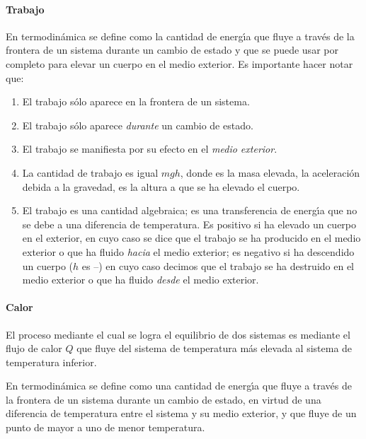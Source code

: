 \paragraph{Trabajo} En termodin\'amica  se define como la cantidad de energ\'{\i}a que fluye a trav\'es de la frontera de un sistema durante un cambio de estado y que se puede usar por completo para elevar un cuerpo en el medio exterior. Es importante hacer notar que:
\begin{enumerate}
\item El trabajo s\'olo aparece en la frontera de un sistema.
\item El trabajo s\'olo aparece \textit{durante} un cambio de estado.
\item El trabajo se manifiesta por su efecto en el \textit{ medio exterior}.
\item La cantidad de trabajo es igual $mgh$, donde  es la masa elevada,
 la aceleraci\'on debida a la gravedad,  es la
altura a que se ha elevado el cuerpo.
\item El trabajo es una cantidad algebraica; es una transferencia de energ\'{\i}a que no se debe a una diferencia de temperatura. Es positivo si ha elevado un cuerpo en el exterior, en cuyo caso se dice que el trabajo se ha producido en
el medio exterior o que ha fluido \textit{hacia} el medio exterior; es
negativo si ha descendido un cuerpo ($h$ es --) en cuyo caso decimos que el
trabajo se ha destruido en el medio exterior o que ha fluido
\textit{desde} el medio exterior.

\end{enumerate}
\paragraph{Calor} El proceso mediante el cual se logra el equilibrio de dos
sistemas es mediante el flujo de calor $Q$ que fluye del sistema de
temperatura m\'as elevada al sistema de temperatura inferior.

En termodin\'amica se define  como una cantidad de energ\'{\i}a que  fluye a trav\'es de la frontera de un sistema durante un cambio de estado, en virtud de una diferencia de temperatura entre el sistema y su medio exterior, y que fluye de un punto de mayor a uno de menor temperatura.

